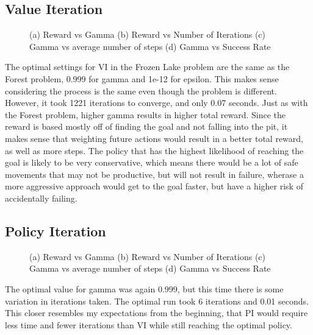 \documentclass[
	letterpaper, %
]{mlreport}
\begin{document}
\subsection{Value Iteration}
\begin{figure}
	\centering
	\caption{(a) Reward vs Gamma (b) Reward vs Number of Iterations (c) Gamma vs average number of steps (d) Gamma vs Success Rate }
	\label{fig:fig6}
\end{figure}
The optimal settings for VI in the Frozen Lake problem are the same as the Forest problem, 0.999 for gamma and 1e-12 for epsilon. This makes sense considering the process is the same even though the problem is different. However, it took 1221 iterations to converge, and only 0.07 seconds. Just as with the Forest problem, higher gamma results in higher total reward. Since the reward is based mostly off of finding the goal and not falling into the pit, it makes sense that weighting future actions would result in a better total reward, as well as more steps. The policy that has the highest likelihood of reaching the goal is likely to be very conservative, which means there would be a lot of safe movements that may not be productive, but will not result in failure, wherase a more aggressive approach would get to the goal faster, but have a higher risk of accidentally failing.

\subsection{Policy Iteration}
\begin{figure}
	\centering
	\caption{(a) Reward vs Gamma (b) Reward vs Number of Iterations (c) Gamma vs average number of steps (d) Gamma vs Success Rate }
	\label{fig:fig7}
\end{figure}
The optimal value for gamma was again 0.999, but this time there is some variation in iterations taken. The optimal run took 6 iterations and 0.01 seconds. This closer resembles my expectations from the beginning, that PI would require less time and fewer iterations than VI while still reaching the optimal policy.
\end{document}
